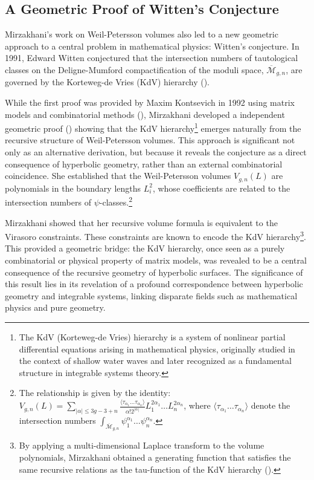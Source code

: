 \subsection{A Geometric Proof of Witten's Conjecture}

Mirzakhani's work on Weil-Petersson volumes also led to a new geometric approach to a central problem in mathematical physics: Witten's conjecture. In 1991, Edward Witten conjectured that the intersection numbers of tautological classes on the Deligne-Mumford compactification of the moduli space, $\overline{\mathcal{M}}_{g,n}$, are governed by the Korteweg-de Vries (KdV) hierarchy (\cite{Witten1991}). 

While the first proof was provided by Maxim Kontsevich in 1992 using matrix models and combinatorial methods (\cite{Kontsevich1992}), Mirzakhani developed a independent geometric proof (\cite{Mirzakhani2007b}) showing that the KdV hierarchy\footnote{The KdV (Korteweg-de Vries) hierarchy is a system of nonlinear 
partial differential equations arising in mathematical physics, 
originally studied in the context of shallow water waves and later 
recognized as a fundamental structure in integrable systems theory.} emerges naturally from the recursive structure of Weil-Petersson volumes.
This approach is significant not only as an alternative derivation, but because it reveals the conjecture as a direct consequence of hyperbolic geometry, rather than an external combinatorial coincidence. She established that the Weil-Petersson volumes $V_{g,n}(L)$ are polynomials in the boundary lengths $L_i^2$, whose coefficients are related to the intersection numbers of $\psi$-classes.\footnote{The relationship is given by the identity: $V_{g,n}(L) = \sum_{|\alpha| \leq 3g-3+n} \frac{\langle \tau_{\alpha_1} \dots \tau_{\alpha_n} \rangle}{\alpha! 2^{|\alpha|}} L_1^{2\alpha_1} \dots L_n^{2\alpha_n}$, where $\langle \tau_{\alpha_1} \dots \tau_{\alpha_n} \rangle$ denote the intersection numbers $\int_{\overline{\mathcal{M}}_{g,n}} \psi_1^{\alpha_1} \dots \psi_n^{\alpha_n}$.}

Mirzakhani showed that her recursive volume formula is equivalent to the Virasoro constraints. These constraints are known to encode the KdV hierarchy\footnote{By applying a multi-dimensional Laplace transform to the volume polynomials, Mirzakhani obtained a generating function that satisfies the same recursive relations as the tau-function of the KdV hierarchy (\cite{Mirzakhani2007b}).}. This provided a geometric bridge: the KdV hierarchy, once seen as a purely combinatorial or physical property of matrix models, was revealed to be a central consequence of the recursive geometry of hyperbolic surfaces.
The significance of this result lies in its revelation of a profound correspondence between hyperbolic geometry and integrable systems, linking disparate fields such as mathematical physics and pure geometry.

